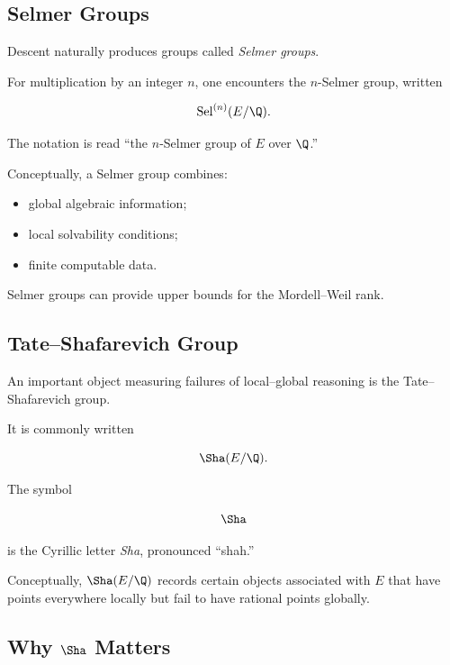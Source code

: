 \subsection{Selmer Groups}
\label{subsec:selmer-groups-introduction}

Descent naturally produces groups called \emph{Selmer groups}.

For multiplication by an integer \(n\), one encounters the \(n\)-Selmer
group, written

\[ \operatorname{Sel}^{(n)}(E/\Q). \]

The notation is read ``the \(n\)-Selmer group of \(E\) over \(\Q\).''

Conceptually, a Selmer group combines:

\begin{itemize}
    \item global algebraic information;
    \item local solvability conditions;
    \item finite computable data.
\end{itemize}

Selmer groups can provide upper bounds for the Mordell--Weil rank.

\subsection{Tate--Shafarevich Group}
\label{subsec:tate-shafarevich-group}

An important object measuring failures of local--global reasoning is the
Tate--Shafarevich group.

It is commonly written

\[ \Sha(E/\Q). \]

The symbol

\[ \Sha \]

is the Cyrillic letter \emph{Sha}, pronounced ``shah.''

Conceptually, \(\Sha(E/\Q)\) records certain objects associated with \(E\)
that have points everywhere locally but fail to have rational points
globally.

\subsection{Why \(\Sha\) Matters}
\label{subsec:why-sha-matters}

